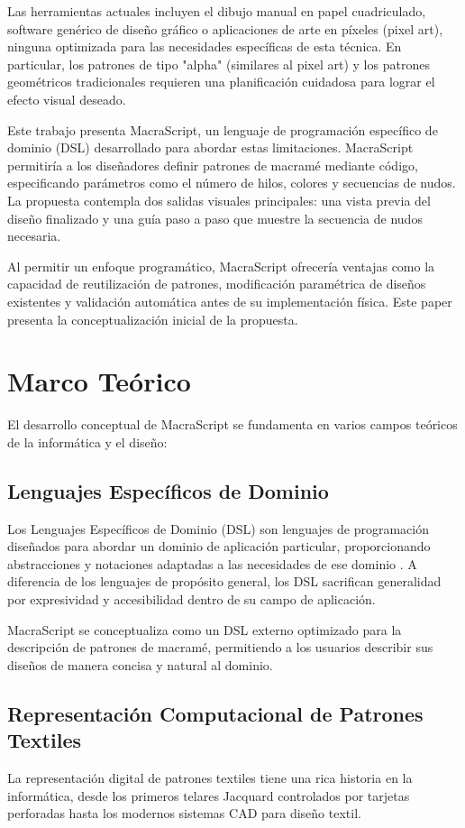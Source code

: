 \documentclass[conference]{IEEEtran}
\begin{document}
Las herramientas actuales incluyen el dibujo manual en papel cuadriculado, software genérico de diseño gráfico o aplicaciones de arte en píxeles (pixel art), ninguna optimizada para las necesidades específicas de esta técnica. En particular, los patrones de tipo "alpha" (similares al pixel art) y los patrones geométricos tradicionales requieren una planificación cuidadosa para lograr el efecto visual deseado.

Este trabajo presenta MacraScript, un lenguaje de programación específico de dominio (DSL) desarrollado para abordar estas limitaciones. MacraScript permitiría a los diseñadores definir patrones de macramé mediante código, especificando parámetros como el número de hilos, colores y secuencias de nudos. La propuesta contempla dos salidas visuales principales: una vista previa del diseño finalizado y una guía paso a paso que muestre la secuencia de nudos necesaria.

Al permitir un enfoque programático, MacraScript ofrecería ventajas como la capacidad de reutilización de patrones, modificación paramétrica de diseños existentes y validación automática antes de su implementación física. Este paper presenta la conceptualización inicial de la propuesta.

\section{Marco Teórico}
El desarrollo conceptual de MacraScript se fundamenta en varios campos teóricos de la informática y el diseño:

\subsection{Lenguajes Específicos de Dominio}
Los Lenguajes Específicos de Dominio (DSL) son lenguajes de programación diseñados para abordar un dominio de aplicación particular, proporcionando abstracciones y notaciones adaptadas a las necesidades de ese dominio \cite{fowler2010}. A diferencia de los lenguajes de propósito general, los DSL sacrifican generalidad por expresividad y accesibilidad dentro de su campo de aplicación.

MacraScript se conceptualiza como un DSL externo optimizado para la descripción de patrones de macramé, permitiendo a los usuarios describir sus diseños de manera concisa y natural al dominio.

\subsection{Representación Computacional de Patrones Textiles}
La representación digital de patrones textiles tiene una rica historia en la informática, desde los primeros telares Jacquard controlados por tarjetas perforadas hasta los modernos sistemas CAD para diseño textil. 
\end{document}
